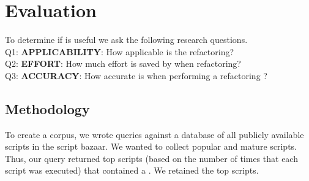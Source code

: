 \documentclass{sigplanconf}
\begin{document}
%
%
%


\section{Evaluation}
\label{sec:evaluation}
To determine if \tool is useful we ask the following research questions.\\
Q1:  \textbf{APPLICABILITY}:  How applicable is the refactoring?\\
Q2:  \textbf{EFFORT}: How much effort is saved by \tool when refactoring?\\
Q3:  \textbf{ACCURACY}: How accurate is \tool when performing a refactoring ?\\
 
\subsection{Methodology}

To create a corpus, we wrote queries against a database of all publicly available scripts in the \TD script bazaar. We wanted to collect popular and mature scripts. 
Thus, our query returned top scripts (based on the number of times that each script was executed) 
that contained a \NC{}. We retained the top \numScripts scripts.
\end{document}

